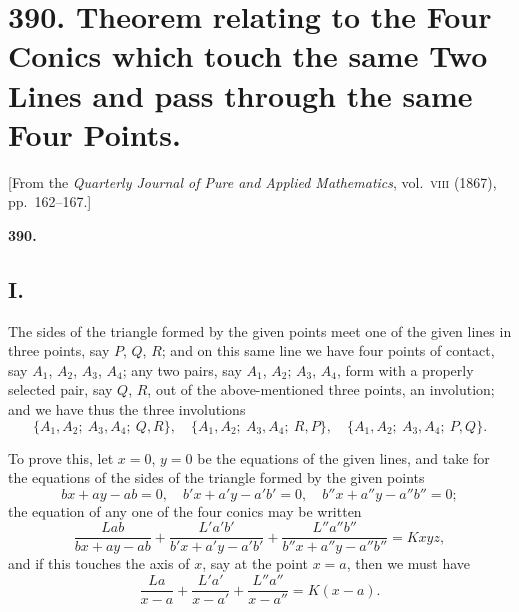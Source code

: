 \documentclass[11pt,a4paper]{article}
\theoremstyle{plain}
\begin{document}
\newpage

\section*{390. Theorem relating to the Four Conics which touch the same Two Lines and pass through the same Four Points.}
\label{sec:390}
\begin{center}
[From the \textit{Quarterly Journal of Pure and Applied Mathematics}, vol.~\textsc{viii} (1867), pp.~162--167.]
\end{center}

\setcounter{equation}{0}

\textbf{390.}

\subsection*{I.}

The sides of the triangle formed by the given points meet one of the given lines in three points, say $P$, $Q$, $R$; and on this same line we have four points of contact, say $A_1$, $A_2$, $A_3$, $A_4$; any two pairs, say $A_1$, $A_2$; $A_3$, $A_4$, form with a properly selected pair, say $Q$, $R$, out of the above-mentioned three points, an involution; and we have thus the three involutions
\begin{equation}
\{A_1, A_2;\ A_3, A_4;\ Q, R\},\quad \{A_1, A_2;\ A_3, A_4;\ R, P\},\quad \{A_1, A_2;\ A_3, A_4;\ P, Q\}.
\end{equation}

To prove this, let $x = 0$, $y = 0$ be the equations of the given lines, and take for the equations of the sides of the triangle formed by the given points
\begin{equation}
bx + ay - ab = 0, \quad b'x + a'y - a'b' = 0, \quad b''x + a''y - a''b'' = 0;
\end{equation}
the equation of any one of the four conics may be written
\begin{equation}
\frac{Lab}{bx+ay-ab} + \frac{L'a'b'}{b'x+a'y-a'b'} + \frac{L''a''b''}{b''x+a''y-a''b''} = Kxyz,
\end{equation}
and if this touches the axis of $x$, say at the point $x = a$, then we must have
\begin{equation}
\frac{La}{x-a} + \frac{L'a'}{x-a'} + \frac{L''a''}{x-a''} = K(x-a).
\end{equation}
\end{document}
